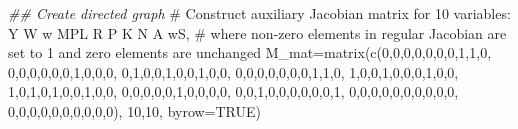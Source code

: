 \documentclass[
  letterpaper,
  DIV=11,
  numbers=noendperiod]{scrreprt}
\newenvironment{Shaded}{\begin{snugshade}}{\end{snugshade}}
\newcommand{\AttributeTok}[1]{\textcolor[rgb]{0.40,0.45,0.13}{#1}}
\newcommand{\CommentTok}[1]{\textcolor[rgb]{0.37,0.37,0.37}{#1}}
\newcommand{\ConstantTok}[1]{\textcolor[rgb]{0.56,0.35,0.01}{#1}}
\newcommand{\DecValTok}[1]{\textcolor[rgb]{0.68,0.00,0.00}{#1}}
\newcommand{\DocumentationTok}[1]{\textcolor[rgb]{0.37,0.37,0.37}{\textit{#1}}}
\newcommand{\FunctionTok}[1]{\textcolor[rgb]{0.28,0.35,0.67}{#1}}
\newcommand{\NormalTok}[1]{\textcolor[rgb]{0.00,0.23,0.31}{#1}}
\newcommand{\OtherTok}[1]{\textcolor[rgb]{0.00,0.23,0.31}{#1}}
\begin{document}
\begin{Shaded}
\begin{Highlighting}[]
\DocumentationTok{\#\# Create directed graph}
\CommentTok{\# Construct auxiliary Jacobian matrix for 10 variables: Y W w MPL R P K N A wS,}
\CommentTok{\# where non{-}zero elements in regular Jacobian are set to 1 and zero elements are unchanged}
\NormalTok{M\_mat}\OtherTok{=}\FunctionTok{matrix}\NormalTok{(}\FunctionTok{c}\NormalTok{(}\DecValTok{0}\NormalTok{,}\DecValTok{0}\NormalTok{,}\DecValTok{0}\NormalTok{,}\DecValTok{0}\NormalTok{,}\DecValTok{0}\NormalTok{,}\DecValTok{0}\NormalTok{,}\DecValTok{0}\NormalTok{,}\DecValTok{1}\NormalTok{,}\DecValTok{1}\NormalTok{,}\DecValTok{0}\NormalTok{,}
               \DecValTok{0}\NormalTok{,}\DecValTok{0}\NormalTok{,}\DecValTok{0}\NormalTok{,}\DecValTok{0}\NormalTok{,}\DecValTok{0}\NormalTok{,}\DecValTok{0}\NormalTok{,}\DecValTok{1}\NormalTok{,}\DecValTok{0}\NormalTok{,}\DecValTok{0}\NormalTok{,}\DecValTok{0}\NormalTok{,}
               \DecValTok{0}\NormalTok{,}\DecValTok{1}\NormalTok{,}\DecValTok{0}\NormalTok{,}\DecValTok{0}\NormalTok{,}\DecValTok{1}\NormalTok{,}\DecValTok{0}\NormalTok{,}\DecValTok{0}\NormalTok{,}\DecValTok{1}\NormalTok{,}\DecValTok{0}\NormalTok{,}\DecValTok{0}\NormalTok{,}
               \DecValTok{0}\NormalTok{,}\DecValTok{0}\NormalTok{,}\DecValTok{0}\NormalTok{,}\DecValTok{0}\NormalTok{,}\DecValTok{0}\NormalTok{,}\DecValTok{0}\NormalTok{,}\DecValTok{0}\NormalTok{,}\DecValTok{1}\NormalTok{,}\DecValTok{1}\NormalTok{,}\DecValTok{0}\NormalTok{,}
               \DecValTok{1}\NormalTok{,}\DecValTok{0}\NormalTok{,}\DecValTok{0}\NormalTok{,}\DecValTok{1}\NormalTok{,}\DecValTok{0}\NormalTok{,}\DecValTok{0}\NormalTok{,}\DecValTok{0}\NormalTok{,}\DecValTok{1}\NormalTok{,}\DecValTok{0}\NormalTok{,}\DecValTok{0}\NormalTok{,}
               \DecValTok{1}\NormalTok{,}\DecValTok{0}\NormalTok{,}\DecValTok{1}\NormalTok{,}\DecValTok{0}\NormalTok{,}\DecValTok{1}\NormalTok{,}\DecValTok{0}\NormalTok{,}\DecValTok{0}\NormalTok{,}\DecValTok{1}\NormalTok{,}\DecValTok{0}\NormalTok{,}\DecValTok{0}\NormalTok{,}
               \DecValTok{0}\NormalTok{,}\DecValTok{0}\NormalTok{,}\DecValTok{0}\NormalTok{,}\DecValTok{0}\NormalTok{,}\DecValTok{0}\NormalTok{,}\DecValTok{1}\NormalTok{,}\DecValTok{0}\NormalTok{,}\DecValTok{0}\NormalTok{,}\DecValTok{0}\NormalTok{,}\DecValTok{0}\NormalTok{,}
               \DecValTok{0}\NormalTok{,}\DecValTok{0}\NormalTok{,}\DecValTok{1}\NormalTok{,}\DecValTok{0}\NormalTok{,}\DecValTok{0}\NormalTok{,}\DecValTok{0}\NormalTok{,}\DecValTok{0}\NormalTok{,}\DecValTok{0}\NormalTok{,}\DecValTok{0}\NormalTok{,}\DecValTok{1}\NormalTok{,}
               \DecValTok{0}\NormalTok{,}\DecValTok{0}\NormalTok{,}\DecValTok{0}\NormalTok{,}\DecValTok{0}\NormalTok{,}\DecValTok{0}\NormalTok{,}\DecValTok{0}\NormalTok{,}\DecValTok{0}\NormalTok{,}\DecValTok{0}\NormalTok{,}\DecValTok{0}\NormalTok{,}\DecValTok{0}\NormalTok{,}
               \DecValTok{0}\NormalTok{,}\DecValTok{0}\NormalTok{,}\DecValTok{0}\NormalTok{,}\DecValTok{0}\NormalTok{,}\DecValTok{0}\NormalTok{,}\DecValTok{0}\NormalTok{,}\DecValTok{0}\NormalTok{,}\DecValTok{0}\NormalTok{,}\DecValTok{0}\NormalTok{,}\DecValTok{0}\NormalTok{), }\DecValTok{10}\NormalTok{,}\DecValTok{10}\NormalTok{, }\AttributeTok{byrow=}\ConstantTok{TRUE}\NormalTok{)}


\end{Highlighting}
\end{Shaded}
\end{document}

